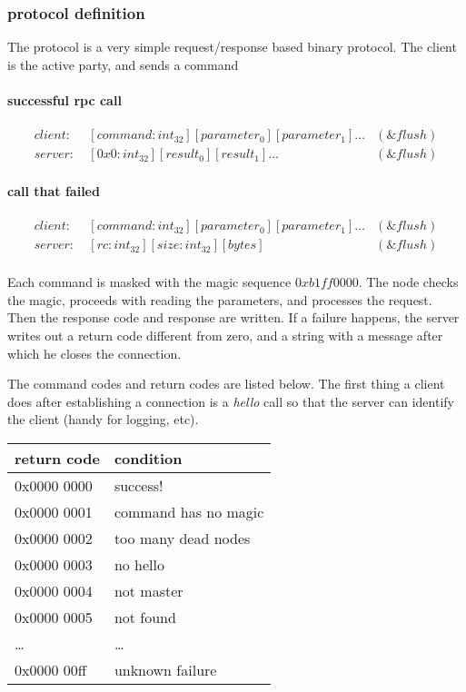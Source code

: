 \subsubsection{protocol definition}
The protocol is a very simple request/response based binary protocol.
The client is the active party, and sends a command
\paragraph{successful rpc call}
\begin{equation*}
\begin{aligned}
client: \ & [command:int_{32}][parameter_0][parameter_1]\ldots & (\&flush) \\
server: \ & [0x0:int_{32}][result_0][result_1]\ldots & (\&flush)
\end{aligned}
\end{equation*}
\paragraph{call that failed}

\begin{equation*}
\begin{aligned}
client: \ & [command : int_{32}][parameter_0][parameter_1]\ldots & (\&flush) \\
server: \ & [rc:int_{32}][size:int_{32}][bytes] & (\&flush) \\
\end{aligned}
\end{equation*}

Each command is masked with the magic sequence $0xb1ff0000$.
The node checks the magic, proceeds with reading the parameters, and processes the request.
Then the response code and response are written.
If a failure happens, the server writes out a return code different from zero, and a string with a message after which he closes the connection.

The command codes and return codes are listed below.
The first thing a client does after establishing a connection is a \emph{hello} call so that the server can identify the client (handy for logging, etc).
\begin{table}[ht]
\begin{tabular}{ll}
return code & condition \\
\hline
0x0000 0000  & success!  \\
0x0000 0001  & command has no magic  \\
0x0000 0002  & too many dead nodes \\
0x0000 0003  & no hello        \\
0x0000 0004  & not master      \\
0x0000 0005  & not found       \\
\ldots       & \ldots          \\
0x0000 00ff  & unknown failure \\
\end{tabular}
\end{table}

